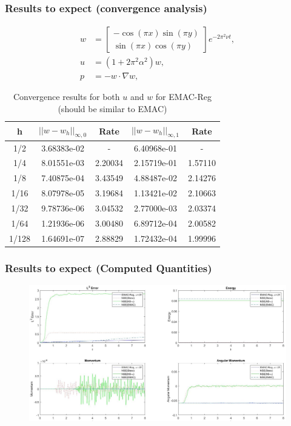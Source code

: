 \documentclass{beamer}
\newcommand{\norm}[1]{\left|\left|{}#1\right|\right|}
\newcommand{\bmat}[1]{\begin{bmatrix} #1 \end{bmatrix}}
\begin{document}
\begin{frame}
\frametitle{Results to expect (convergence analysis)}
\begin{align*}
w &= \bmat{-\cos(\pi x)\sin(\pi y)\\ \sin(\pi x)\cos(\pi y)}e^{-2\pi^2\nu t},\\
u &= (1+2\pi^2\alpha^2)w,\\
p &= -w \cdot \nabla w,
\end{align*}
\begin{table}[H]
\begin{scriptsize}
\begin{tabular}{|c||c|c||c|c||}
\hline
h & $\norm{w-w_h}_{\infty,0}$ & Rate & $\norm{w-w_h}_{\infty,1}$ & Rate\\
\hline
1/2 & 3.68383e-02 & - & 6.40968e-01 & -\\
\hline
1/4 & 8.01551e-03 & 2.20034 & 2.15719e-01 & 1.57110\\
\hline
1/8 & 7.40875e-04 & 3.43549 & 4.88487e-02 & 2.14276\\
\hline
1/16 & 8.07978e-05 & 3.19684 & 1.13421e-02 & 2.10663\\
\hline
1/32 & 9.78736e-06 & 3.04532 & 2.77000e-03 & 2.03374\\
\hline
1/64 & 1.21936e-06 & 3.00480 & 6.89712e-04 & 2.00582\\
\hline
1/128 & 1.64691e-07 & 2.88829 & 1.72432e-04 & 1.99996\\
\hline
\end{tabular}
\end{scriptsize}
\caption{Convergence results for both $u$ and $w$ for EMAC-Reg (should be similar to EMAC)}
\label{fig:convergence}
\end{table}
\end{frame}


\begin{frame}
\frametitle{Results to expect (Computed Quantities)}
\begin{figure}
\includegraphics[scale=.25]{Quant_Comparison.jpg}
\end{figure}
\end{frame}
\end{document}
